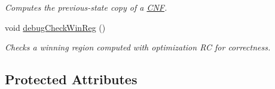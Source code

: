 \begin{DoxyCompactItemize}
\begin{DoxyCompactList}\small\item\em Computes the previous-\/state copy of a \hyperlink{classCNF}{C\-N\-F}. \end{DoxyCompactList}\item 
void \hyperlink{classLearnSynthSAT_a83be7c843ad7ffb8a15a377b2227c891}{debug\-Check\-Win\-Reg} ()
\begin{DoxyCompactList}\small\item\em Checks a winning region computed with optimization R\-C for correctness. \end{DoxyCompactList}\end{DoxyCompactItemize}
\subsection*{Protected Attributes}
